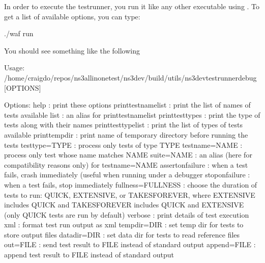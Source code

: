\documentclass[letterpaper,10pt,english]{sphinxmanual}
\renewcommand{\sphinxcode}[1]{\texttt{\small{#1}}}
\begin{document}
In order to execute the test\sphinxhyphen{}runner, you run it like any other  executable
\textendash{} using \sphinxcode{}.  To get a list of available options, you can type:

\begin{sphinxVerbatim}[commandchars=\\\{\}]
\PYGZdl{} ./waf \PYGZhy{}\PYGZhy{}run 
\end{sphinxVerbatim}

You should see something like the following

\begin{sphinxVerbatim}[commandchars=\\\{\}]
Usage: /home/craigdo/repos/ns\PYGZhy{}3\PYGZhy{}allinone\PYGZhy{}test/ns\PYGZhy{}3\PYGZhy{}dev/build/utils/ns3\PYGZhy{}dev\PYGZhy{}test\PYGZhy{}runner\PYGZhy{}debug [OPTIONS]

Options:
\PYGZhy{}\PYGZhy{}help                 : print these options
\PYGZhy{}\PYGZhy{}print\PYGZhy{}test\PYGZhy{}name\PYGZhy{}list : print the list of names of tests available
\PYGZhy{}\PYGZhy{}list                 : an alias for \PYGZhy{}\PYGZhy{}print\PYGZhy{}test\PYGZhy{}name\PYGZhy{}list
\PYGZhy{}\PYGZhy{}print\PYGZhy{}test\PYGZhy{}types     : print the type of tests along with their names
\PYGZhy{}\PYGZhy{}print\PYGZhy{}test\PYGZhy{}type\PYGZhy{}list : print the list of types of tests available
\PYGZhy{}\PYGZhy{}print\PYGZhy{}temp\PYGZhy{}dir       : print name of temporary directory before running
                         the tests
\PYGZhy{}\PYGZhy{}test\PYGZhy{}type=TYPE       : process only tests of type TYPE
\PYGZhy{}\PYGZhy{}test\PYGZhy{}name=NAME       : process only test whose name matches NAME
\PYGZhy{}\PYGZhy{}suite=NAME           : an alias (here for compatibility reasons only)
                         for \PYGZhy{}\PYGZhy{}test\PYGZhy{}name=NAME
\PYGZhy{}\PYGZhy{}assert\PYGZhy{}on\PYGZhy{}failure    : when a test fails, crash immediately (useful
                         when running under a debugger
\PYGZhy{}\PYGZhy{}stop\PYGZhy{}on\PYGZhy{}failure      : when a test fails, stop immediately
\PYGZhy{}\PYGZhy{}fullness=FULLNESS    : choose the duration of tests to run: QUICK,
                         EXTENSIVE, or TAKES\PYGZus{}FOREVER, where EXTENSIVE
                         includes QUICK and TAKES\PYGZus{}FOREVER includes
                         QUICK and EXTENSIVE (only QUICK tests are
                         run by default)
\PYGZhy{}\PYGZhy{}verbose              : print details of test execution
\PYGZhy{}\PYGZhy{}xml                  : format test run output as xml
\PYGZhy{}\PYGZhy{}tempdir=DIR          : set temp dir for tests to store output files
\PYGZhy{}\PYGZhy{}datadir=DIR          : set data dir for tests to read reference files
\PYGZhy{}\PYGZhy{}out=FILE             : send test result to FILE instead of standard output
\PYGZhy{}\PYGZhy{}append=FILE          : append test result to FILE instead of standard output
\end{sphinxVerbatim}
\end{document}
